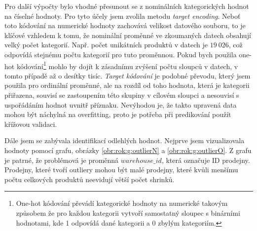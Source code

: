 Pro další výpočty bylo vhodné přesunout se z nominálních kategorických hodnot na číselné hodnoty. Pro tyto účely jsem zvolila metodu \emph{target encoding}.  %
Neboť toto kódování na numerické hodnoty zachovává velikost datového souboru, to je klíčové vzhledem k tomu, že nominální proměnné ve zkoumaných datech obsahují velký počet kategorií. Např. počet unikátních produktů v datech je $19\ 026$, což odpovídá stejnému počtu kategorií pro tuto proměnnou. Pokud bych použila one-hot kódování\footnote{One-hot kódování převádí kategorické hodnoty na numerické takovým způsobem že pro každou kategorii vytvoří samostatný sloupec s binárními hodnotami, kde 1 odpovídá dané kategorii a 0 zbylým kategoriím.}  mohlo by dojít k zásadnímu zvýšení počtu sloupců v datech, v tomto případě až o desítky tisíc. \emph{Target kódování} je podobné převodu, který jsem použila pro ordinální proměnné, ale na rozdíl od toho hodnota, která je kategorii přiřazena, souvisí se zastoupením této skupiny v cílovém sloupci a nesouvisí s uspořádáním hodnot uvnitř příznaku. Nevýhodou je, že takto upravená data mohou být náchylná na overfitting, proto je potřeba při predikování použít křížovou validaci.\cite{encoding}


Dále jsem se zabývala identifikací odlehlých hodnot. Nejprve jsem vizualizovala hodnoty pomocí grafu, obrázky \ref*{obr:rok:g:outlierN} a \ref*{obr:rok:g:outlierO}. Z grafu je patrné, že problémová je proměnná $warehouse\_id$, která označuje ID prodejny. Prodejny, které tvoří outliery mohou být malé prodejny, které kvůli menšímu počtu celkových produktů neevidují větší počet shrinků. %

